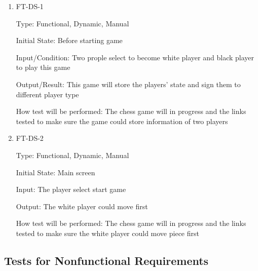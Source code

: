 \documentclass[12pt, titlepage]{article}
\begin{document}
\begin{enumerate}

\item{FT-DS-1\\}

Type: Functional, Dynamic, Manual
					
Initial State: Before starting game
					
Input/Condition: Two prople select to become white player and black player to play this game
					
Output/Result: This game will store the players' state and sign them to different player type
					
How test will be performed: The chess game will in progress and the links tested to make sure the game could store information of two players

\item{FT-DS-2\\}

Type: Functional, Dynamic, Manual
					
Initial State: Main screen
					
Input: The player select start game
					
Output: The white player could move first
					
How test will be performed: The chess game will in progress and the links tested to make sure the white player could move piece first




\end{enumerate}

\subsection{Tests for Nonfunctional Requirements}
\end{document}
